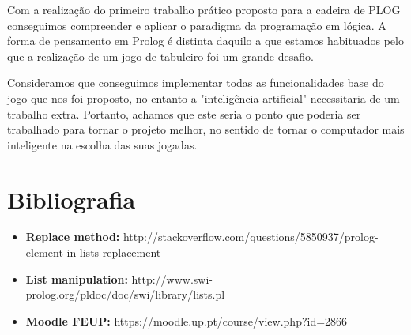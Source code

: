 Com a realização do primeiro trabalho prático proposto para a cadeira de PLOG conseguimos compreender e aplicar o paradigma da programação em lógica.  A forma de pensamento em Prolog é distinta daquilo a que estamos habituados pelo que a realização de um jogo de tabuleiro foi um grande desafio.



Consideramos que conseguimos implementar todas as funcionalidades base do jogo que nos foi proposto, no entanto a "inteligência artificial" necessitaria de um trabalho extra. Portanto, achamos que este seria o ponto que poderia ser trabalhado para tornar o projeto melhor, no sentido de tornar o computador mais inteligente na escolha das suas jogadas. 

\newpage

\section{Bibliografia}

\vspace{1cm}

\begin{itemize}
  \item{\textbf{Replace method:} http://stackoverflow.com/questions/5850937/prolog-element-in-lists-replacement}
  \item{\textbf{List manipulation:} http://www.swi-prolog.org/pldoc/doc/swi/library/lists.pl}
  \item{\textbf{Moodle FEUP:} https://moodle.up.pt/course/view.php?id=2866}
\end{itemize}


